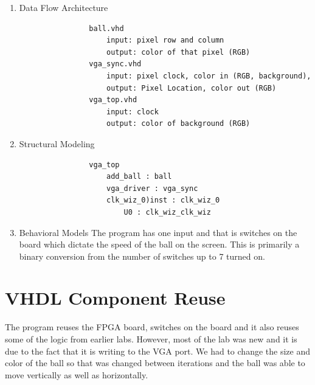     \begin{enumerate}
        \item Data Flow Architecture
            \begin{verbatim}
                ball.vhd
                    input: pixel row and column
                    output: color of that pixel (RGB)
                vga_sync.vhd
                    input: pixel clock, color in (RGB, background),
                    output: Pixel Location, color out (RGB)
                vga_top.vhd
                    input: clock
                    output: color of background (RGB)
            \end{verbatim}
        \item Structural Modeling
            \begin{verbatim}
                vga_top 
                    add_ball : ball
                    vga_driver : vga_sync
                    clk_wiz_0)inst : clk_wiz_0
                        U0 : clk_wiz_clk_wiz
            \end{verbatim}
        \item Behavioral Models
            The program has one input and that is switches on the board which dictate the speed of the ball on the screen. This is primarily a binary conversion from the number of switches up to 7 turned on. 
     \end{enumerate}

 \section{VHDL Component Reuse}
    The program reuses the FPGA board, switches on the board and it also reuses some of the logic from earlier labs. However, most of the lab was new and it is due to the fact that it is writing to the VGA port. We had to change the size and color of the ball so that was changed between iterations and the ball was able to move vertically as well as horizontally. 
